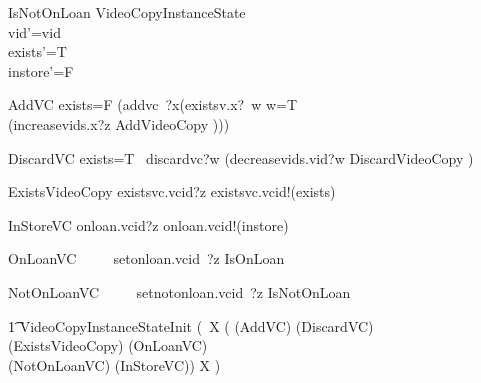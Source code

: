\documentclass{article}
\begin{document}
\begin{schema}{IsNotOnLoan}
   \Delta VideoCopyInstanceState \\
    \where
    vid'=vid\\
    exists'=T\\
    instore'=F\\
\end{schema}

\begin{circusaction}
     AddVC \circdef \lcircguard exists=F \rcircguard  \circguard
     				(addvc~?x\then (existsv.x?~w \then \lcircguard w=T \rcircguard \circguard \\
						 (increasevids.x?z \then \lschexpract AddVideoCopy \rschexpract)))  \\
\end{circusaction}

\begin{circusaction}
     DiscardVC \circdef \lcircguard exists=T \rcircguard  \circguard\ discardvc?w \then (decreasevids.vid?w \then  \lschexpract DiscardVideoCopy \rschexpract) \\
\end{circusaction}

\begin{circusaction}
     ExistsVideoCopy \circdef existsvc.vcid?z \then existsvc.vcid!(exists) \then \Skip \\
\end{circusaction}

\begin{circusaction}
     InStoreVC \circdef onloan.vcid?z \then onloan.vcid!(instore) \then \Skip \\
\end{circusaction}

\begin{circusaction}
     OnLoanVC ~~\circdef~~ setonloan.vcid~?z \then \lschexpract IsOnLoan \rschexpract  \\
\end{circusaction}

\begin{circusaction}
     NotOnLoanVC ~~\circdef~~ setnotonloan.vcid~?z \then \lschexpract IsNotOnLoan \rschexpract  \\
\end{circusaction}

\begin{circusaction}
   \t1 \circspot \lschexpract  VideoCopyInstanceStateInit \rschexpract\circseq  (\circmu\ X \circspot (
   					(AddVC)
					\extchoice
					(DiscardVC)\\
					\extchoice
					(ExistsVideoCopy)
					\extchoice
					(OnLoanVC)\\
					\extchoice
					(NotOnLoanVC)
					\extchoice
					(InStoreVC))
					\circseq X )
\end{circusaction}
\end{document}
